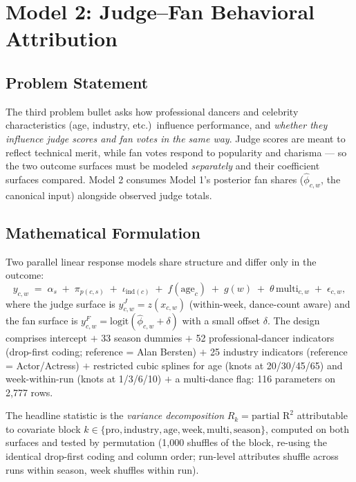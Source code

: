 \documentclass[11pt]{article}
\begin{document}
\section{Model 2: Judge--Fan Behavioral Attribution}
\label{sec:model2}

\subsection{Problem Statement}

The third problem bullet asks how professional dancers and celebrity characteristics
(age, industry, etc.)\ influence performance, and \emph{whether they influence judge
scores and fan votes in the same way}. Judge scores are meant to reflect technical
merit, while fan votes respond to popularity and charisma --- so the two outcome
surfaces must be modeled \emph{separately} and their coefficient surfaces compared.
Model 2 consumes Model 1's posterior fan shares ($\hat\phi_{c,w}$, the canonical
input) alongside observed judge totals.

\subsection{Mathematical Formulation}

Two parallel linear response models share structure and differ only in the outcome:
\begin{equation}
y_{c,w} \;=\; \alpha_s \;+\; \pi_{p(c,s)} \;+\; \iota_{\text{ind}(c)} \;+\; f(\text{age}_c)
\;+\; g(w) \;+\; \theta\,\text{multi}_{c,w} \;+\; \epsilon_{c,w},
\label{eq:m2}
\end{equation}
where the judge surface is $y^J_{c,w} = z(x_{c,w})$ (within-week, dance-count aware)
and the fan surface is $y^F_{c,w} = \text{logit}(\hat\phi_{c,w} + \delta)$ with a
small offset $\delta$. The design comprises intercept $+$ 33 season dummies $+$ 52
professional-dancer indicators (drop-first coding; reference = Alan Bersten) $+$ 25
industry indicators (reference = Actor/Actress) $+$ restricted cubic splines for age
(knots at 20/30/45/65) and week-within-run (knots at 1/3/6/10) $+$ a multi-dance
flag: 116 parameters on 2{,}777 rows.

The headline statistic is the \emph{variance decomposition}
$R_k = \text{partial R}^2$ attributable to covariate block $k \in \{\text{pro},
\text{industry}, \text{age}, \text{week}, \text{multi}, \text{season}\}$, computed
on both surfaces and tested by permutation (1{,}000 shuffles of the block, re-using
the identical drop-first coding and column order; run-level attributes shuffle
across runs within season, week shuffles within run).
\end{document}
